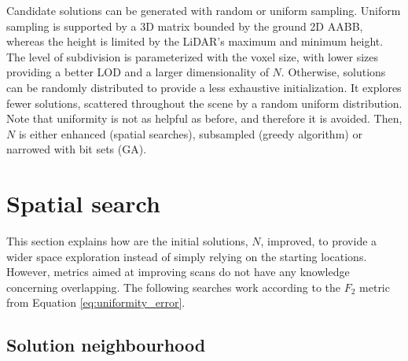 Candidate solutions can be generated with random or uniform sampling. Uniform sampling is supported by a 3D matrix bounded by the ground 2D AABB, whereas the height is limited by the LiDAR's maximum and minimum height. The level of subdivision is parameterized with the voxel size, with lower sizes providing a better LOD and a larger dimensionality of $N$. Otherwise, solutions can be randomly distributed to provide a less exhaustive initialization. It explores fewer solutions, scattered throughout the scene by a random uniform distribution. Note that uniformity is not as helpful as before, and therefore it is avoided. Then, $N$ is either enhanced (spatial searches), subsampled (greedy algorithm) or narrowed with bit sets (GA). 

\section{Spatial search}

This section explains how are the initial solutions, $N$, improved, to provide a wider space exploration instead of simply relying on the starting locations. However, metrics aimed at improving scans do not have any knowledge concerning overlapping. The following searches work according to the $F_2$ metric from Equation \ref{eq:uniformity_error}.

\subsection{Solution neighbourhood}


